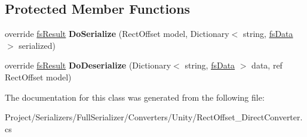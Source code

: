 \subsection*{Protected Member Functions}
\begin{DoxyCompactItemize}
\item 
\mbox{\label{class_full_serializer_1_1_internal_1_1_direct_converters_1_1_rect_offset___direct_converter_a8959a2c6c51c1d84abd288541f98145b}} 
override \hyperlink{struct_full_serializer_1_1fs_result}{fs\+Result} {\bfseries Do\+Serialize} (Rect\+Offset model, Dictionary$<$ string, \hyperlink{class_full_serializer_1_1fs_data}{fs\+Data} $>$ serialized)
\item 
\mbox{\label{class_full_serializer_1_1_internal_1_1_direct_converters_1_1_rect_offset___direct_converter_adea41ce680e0167a48f5a92866bde8a4}} 
override \hyperlink{struct_full_serializer_1_1fs_result}{fs\+Result} {\bfseries Do\+Deserialize} (Dictionary$<$ string, \hyperlink{class_full_serializer_1_1fs_data}{fs\+Data} $>$ data, ref Rect\+Offset model)
\end{DoxyCompactItemize}


The documentation for this class was generated from the following file\+:\begin{DoxyCompactItemize}
\item 
Project/\+Serializers/\+Full\+Serializer/\+Converters/\+Unity/Rect\+Offset\+\_\+\+Direct\+Converter.\+cs\end{DoxyCompactItemize}
